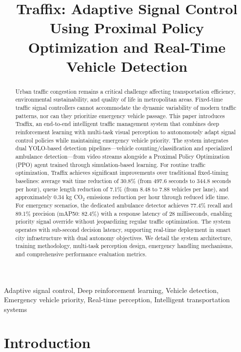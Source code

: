 \documentclass[10pt,conference]{IEEEtran}
\title{Traffix: Adaptive Signal Control Using Proximal Policy Optimization and Real-Time Vehicle Detection}
\author{
\IEEEauthorblockN{Graduate Research Team}
\IEEEauthorblockA{
    Department of Computer Science and Engineering \\
    Advanced Transportation Systems Laboratory
}
}
\begin{document}
\maketitle

\begin{abstract}
Urban traffic congestion remains a critical challenge affecting transportation efficiency, environmental sustainability, and quality of life in metropolitan areas. Fixed-time traffic signal controllers cannot accommodate the dynamic variability of modern traffic patterns, nor can they prioritize emergency vehicle passage. This paper introduces Traffix, an end-to-end intelligent traffic management system that combines deep reinforcement learning with multi-task visual perception to autonomously adapt signal control policies while maintaining emergency vehicle priority. The system integrates dual YOLO-based detection pipelines—vehicle counting/classification and specialized ambulance detection—from video streams alongside a Proximal Policy Optimization (PPO) agent trained through simulation-based learning. For routine traffic optimization, Traffix achieves significant improvements over traditional fixed-timing baselines: average wait time reduction of 30.8\% (from 497.6 seconds to 344.8 seconds per hour), queue length reduction of 7.1\% (from 8.48 to 7.88 vehicles per lane), and approximately 0.34 kg CO$_2$ emissions reduction per hour through reduced idle time. For emergency scenarios, the dedicated ambulance detector achieves 77.4\% recall and 89.1\% precision (mAP50: 82.4\%) with a response latency of 28 milliseconds, enabling priority signal override without jeopardizing regular traffic optimization. The system operates with sub-second decision latency, supporting real-time deployment in smart city infrastructure with dual autonomy objectives. We detail the system architecture, training methodology, multi-task perception design, emergency handling mechanisms, and comprehensive performance evaluation metrics.
\end{abstract}

\begin{IEEEkeywords}
Adaptive signal control, Deep reinforcement learning, Vehicle detection, Emergency vehicle priority, Real-time perception, Intelligent transportation systems
\end{IEEEkeywords}

\section{Introduction}
\end{document}

